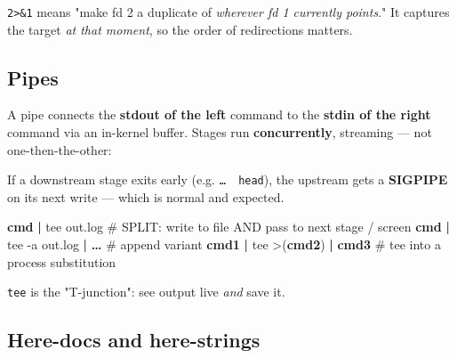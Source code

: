 \documentclass[11pt]{article}
\newenvironment{Shaded}{\begin{snugshade}}{\end{snugshade}}
\newcommand{\AttributeTok}[1]{\textcolor[rgb]{0.16,0.50,0.73}{#1}}
\newcommand{\CommentTok}[1]{\textcolor[rgb]{0.48,0.49,0.49}{#1}}
\newcommand{\ExtensionTok}[1]{\textcolor[rgb]{0.00,0.60,1.00}{\textbf{#1}}}
\newcommand{\FunctionTok}[1]{\textcolor[rgb]{0.56,0.27,0.68}{#1}}
\newcommand{\KeywordTok}[1]{\textcolor[rgb]{0.81,0.81,0.76}{\textbf{#1}}}
\newcommand{\NormalTok}[1]{\textcolor[rgb]{0.81,0.81,0.76}{#1}}
\newcommand{\OperatorTok}[1]{\textcolor[rgb]{0.81,0.81,0.76}{#1}}
\newcommand{\StringTok}[1]{\textcolor[rgb]{0.96,0.31,0.31}{#1}}
\begin{document}
\texttt{2\textgreater{}\&1} means "make fd 2 a duplicate of \emph{wherever fd 1 currently points}." It captures the target \emph{at that moment}, so the order of redirections matters.

\subsection{Pipes}\label{pipes}

A pipe \texttt{\textbar{}} connects the \textbf{stdout of the left} command to the \textbf{stdin of the right} command via an in-kernel buffer. Stages run \textbf{concurrently}, streaming --- not one-then-the-other:


\begin{Shaded}
\end{Shaded}

If a downstream stage exits early (e.g. \texttt{…\ \textbar{}\ head}), the upstream gets a \textbf{SIGPIPE} on its next write --- which is normal and expected.


\begin{Shaded}
\begin{Highlighting}[]
\ExtensionTok{cmd} \KeywordTok{|} \FunctionTok{tee}\NormalTok{ out.log            }\CommentTok{\# SPLIT: write to file AND pass to next stage / screen}
\ExtensionTok{cmd} \KeywordTok{|} \FunctionTok{tee} \AttributeTok{{-}a}\NormalTok{ out.log }\KeywordTok{|} \ExtensionTok{…}     \CommentTok{\# append variant}
\ExtensionTok{cmd1} \KeywordTok{|} \FunctionTok{tee} \OperatorTok{\textgreater{}(}\ExtensionTok{cmd2}\OperatorTok{)} \KeywordTok{|} \ExtensionTok{cmd3}    \CommentTok{\# tee into a process substitution}
\end{Highlighting}
\end{Shaded}

\texttt{tee} is the "T-junction": see output live \emph{and} save it.

\subsection{Here-docs and here-strings}\label{here-docs-and-here-strings}
\end{document}
